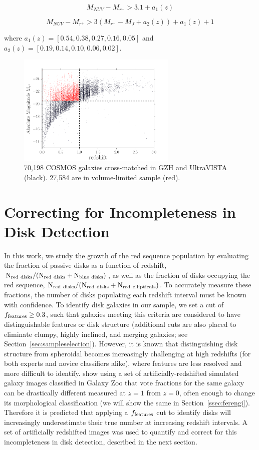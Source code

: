 \documentclass[useAMS,usenatbib]{mn2e}
\begin{document}
\begin{equation}
M_{NUV}-M_{r^{+}} > 3.1 + a_{1}(z)
\end{equation}

\begin{equation}
M_{NUV}-M_{r^{+}} > 3(M_{r^{+}}-M_{J} + a_{2}(z))+ a_{1}(z) + 1  
\end{equation}

where $a_{1}(z) = [0.54,0.38,0.27,0.16,0.05]$ and $a_{2}(z) = [0.19,0.14,0.10,0.06,0.02]$. 
\begin{figure}
\centering
\includegraphics[width=3in]{figures/mag_z_limit.pdf}
\caption{70,198 COSMOS galaxies cross-matched in GZH and UltraVISTA (black). 27,584 are in volume-limited sample (red).}
\label{fig:volume_lim}
\end{figure}   

\section{Correcting for Incompleteness in Disk Detection}

In this work, we study the growth of the red sequence population by evaluating the fraction of passive disks as a function of redshift, $\rm N_{red~disks}/(N_{red~disks}+N_{blue~disks})$, as well as the fraction of disks occupying the red sequence, $\rm N_{red~disks}/(N_{red~disks}+N_{red~ellipticals})$. To accurately measure these fractions, the number of disks populating each redshift interval must be known with confidence. To identify disk galaxies in our sample, we set a cut of $f_{\rm features}\ge0.3$, such that galaxies meeting this criteria are considered to have distinguishable features or disk structure (additional cuts are also placed to eliminate clumpy, highly inclined, and merging galaxies; see Section~\ref{sec:sampleselection}). However, it is known that distinguishing disk structure from spheroidal becomes increasingly challenging at high redshifts (for both experts and novice classifiers alike), where features are less resolved and more difficult to identify. \citet{Willett2016} show using a set of artificially-redshifted simulated galaxy images classified in Galaxy Zoo that vote fractions for the same galaxy can be drastically different measured at $z=1$ from $z=0$, often enough to change its morphological classification (we will show the same in Section~\ref{ssec:ferengi}).  Therefore it is predicted that applying a $f_{\rm features}$ cut to identify disks will increasingly underestimate their true number at increasing redshift intervals. A set of artificially redshifted images was used to quantify and correct for this incompleteness in disk detection, described in the next section.
 
\end{document}
